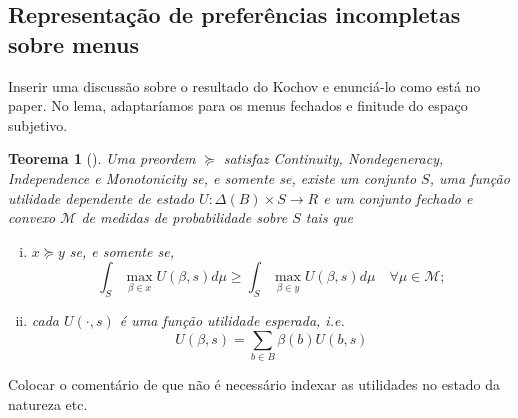 \documentclass[11pt, a4paper]{article}
\theoremstyle{nonumberplain}
\theoremstyle{plain}
\newtheorem{theorem}{Teorema}
\theoremstyle{plain}
\theoremstyle{plain}
\begin{document}
\subsection{Representação de preferências incompletas sobre menus}
{\color{cadmiumgreen}Inserir uma discussão sobre o resultado do Kochov e enunciá-lo como está no paper. No lema, adaptaríamos para os menus fechados e finitude do espaço subjetivo.}

\begin{theorem}[\cite{Kochov2007}]\label{kochov} Uma preordem $\succcurlyeq$ satisfaz \emph{Continuity}, \emph{Nondegeneracy}, \emph{Independence} e \emph{Monotonicity} se, e somente se, existe um conjunto $S$, uma função utilidade dependente de estado $U:\Delta(B)\times S\rightarrow R$ e um conjunto fechado e convexo $\mathcal{M}$ de medidas de probabilidade sobre $S$ tais que
\begin{enumerate}[(i)]
\item $x\succcurlyeq y$ se, e somente se, $$ \int_{S} \max_{\beta\in x}U(\beta,s)d\mu \geq \int_{S} \max_{\beta\in y}U(\beta,s)d\mu\quad \forall\mu\in\mathcal{M};$$
\item cada $U(\cdot,s)$ é uma função utilidade esperada, i.e. $$U(\beta,s)=\sum_{b\in B} \beta(b)U(b,s)$$ 
\end{enumerate} 
\end{theorem}

{\color{cadmiumgreen}Colocar o comentário de que não é necessário indexar as utilidades no estado da natureza etc.}
\end{document}
